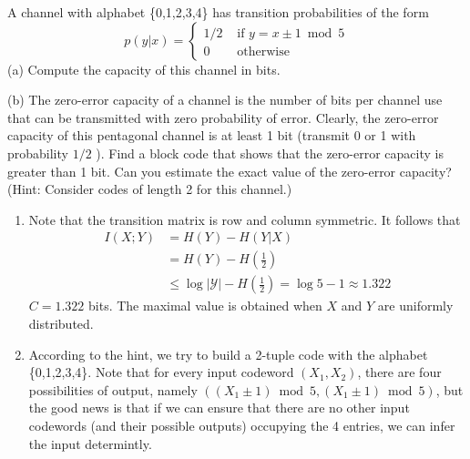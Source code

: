 \begin{exercise}{A channel with alphabet \{0,1,2,3,4\} has transition probabilities of the form
  $$
  p(y | x)=\left\{\begin{array}{cl}
  1 / 2 & \text { if } y=x \pm 1 \bmod 5 \\
  0 & \text { otherwise }
  \end{array}\right.
  $$
  (a) Compute the capacity of this channel in bits.

  (b) The zero-error capacity of a channel is the number of bits per channel use that can be transmitted with zero probability of error. Clearly, the zero-error capacity of this pentagonal channel is at least 1 bit (transmit 0 or 1 with probability $1 / 2$ ). Find a block code that shows that the zero-error capacity is greater than 1 bit. Can you estimate the exact value of the zero-error capacity? (Hint: Consider codes of length 2 for this channel.)}
  \begin{solution}
  \begin{enumerate}
    \item {
      Note that the transition matrix is row and column symmetric. It follows that
      \begin{equation}
        \begin{aligned}
          I(X ; Y) &=H(Y)-H(Y | X) \\
          &=H(Y)-H(\frac{1}{2}) \\
          & \leq \log |\mathcal{Y}|-H(\frac{1}{2}) = \log 5 - 1 \approx1.322
          \end{aligned}
      \end{equation}
      $C = 1.322$ bits. The maximal value is obtained when $X$ and $Y$ are uniformly distributed.
    }
    \item {
      According to the hint, we try to build a 2-tuple code with the alphabet \{0,1,2,3,4\}. Note that for every input codeword $\left(X_1,X_2\right)$, there are four possibilities of output, namely $\left((X_1 \pm 1) \bmod 5 ,(X_1 \pm 1) \bmod 5\right)$, but the good news is that if we can ensure that there are no other input codewords (and their possible outputs) occupying the 4 entries, we can infer the input determintly.
      
}
\end{enumerate}
\end{solution}
\end{exercise}
